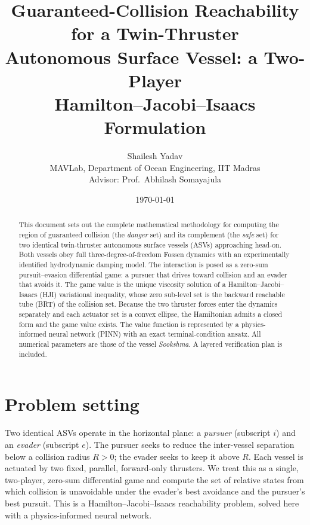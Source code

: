 \documentclass[11pt]{article}
\title{\textbf{Guaranteed-Collision Reachability for a Twin-Thruster\\
Autonomous Surface Vessel: a Two-Player\\
Hamilton--Jacobi--Isaacs Formulation}}
\author{Shailesh Yadav\\
\small MAVLab, Department of Ocean Engineering, IIT Madras\\
\small Advisor: Prof.\ Abhilash Somayajula}
\date{\today}
\begin{document}
\pagestyle{plain}
\maketitle

\begin{abstract}
This document sets out the complete mathematical methodology for computing the
region of guaranteed collision (the \emph{danger} set) and its complement (the
\emph{safe} set) for two identical twin-thruster autonomous surface vessels
(ASVs) approaching head-on. Both vessels obey full three-degree-of-freedom
Fossen dynamics with an experimentally identified hydrodynamic damping model.
The interaction is posed as a zero-sum pursuit--evasion differential game: a
pursuer that drives toward collision and an evader that avoids it. The game value
is the unique viscosity solution of a Hamilton--Jacobi--Isaacs (HJI) variational
inequality, whose zero sub-level set is the backward reachable tube (BRT) of the
collision set. Because the two thruster forces enter the dynamics separately and
each actuator set is a convex ellipse, the Hamiltonian admits a closed form and
the game value exists. The value function is represented by a physics-informed
neural network (PINN) with an exact terminal-condition ansatz. All numerical
parameters are those of the vessel \emph{Sookshma}. A layered verification plan is
included.
\end{abstract}

\tableofcontents

\section{Problem setting}
Two identical ASVs operate in the horizontal plane: a \emph{pursuer} (subscript
$i$) and an \emph{evader} (subscript $e$). The pursuer seeks to reduce the
inter-vessel separation below a collision radius $R>0$; the evader seeks to keep
it above $R$. Each vessel is actuated by two fixed, parallel, forward-only
thrusters. We treat this as a single, two-player, zero-sum differential game and
compute the set of relative states from which collision is unavoidable under the
evader's best avoidance and the pursuer's best pursuit. This is a
Hamilton--Jacobi--Isaacs reachability problem, solved here with a
physics-informed neural network.

\end{document}
